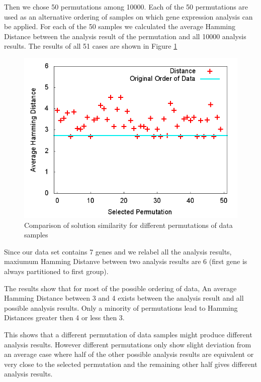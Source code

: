 Then we chose 50 permutations among 10000. Each of the 50 permutations are used as an alternative ordering of samples on which gene expression analysis can be applied. For each of the 50 samples we calculated the average Hamming Distance between the analysis result of the permutation and all 10000 analysis results. The results of all 51 cases are shown in Figure \ref{figure:permutations}

\begin{figure}
 \centering \includegraphics[scale=0.375]{experiments/graph-permutation.png}
\caption{Comparison of solution similarity for different permutations of data samples}\label{figure:permutations}
\end{figure}

Since our data set contains 7 genes and we relabel all the analysis results, maxiumum Hamming Distanve between two analysis results are 6 (first gene is always partitioned to first group). 

The results show that for most of the possible ordering of data, An average Hamming Distance between 3 and 4 exists between the analysis result and all possible analysis results. Only a minority of permutations lead to Hamming Distances greater then 4 or less then 3. 

This shows that a different permutation of data samples might produce different analysis results. However different permutations only show slight deviation from an average case where half of the other possible analysis results are equivalent or very close to the selected permutation and the remaining other half gives different analysis results. 


